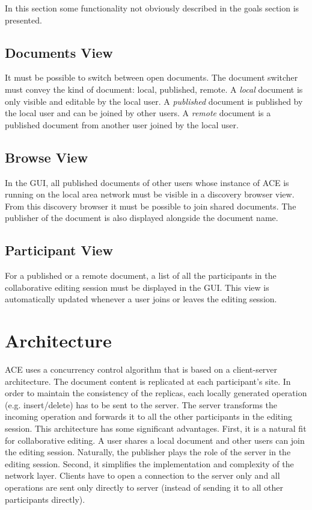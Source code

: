 \documentclass[11pt,a4paper]{article}
\begin{document}
In this section some functionality not obviously described in the goals section
is presented.

\subsection{Documents View}
It must be possible to switch between open documents. The document switcher must
convey the kind of document: local, published, remote. A
\emph{local} document is only visible and editable by the local user. A
\emph{published} document is published by the local user and can be joined by
other users. A \emph{remote} document is a published document from another
user joined by the local user.

\subsection{Browse View}
In the GUI, all published documents of other users whose instance of ACE
is running on the local area network must be visible in a discovery browser
view. From this discovery browser it must be possible to join shared documents.
The publisher of the document is also displayed alongside the document name.

\subsection{Participant View}
For a published or a remote document, a list of all the participants in the
collaborative editing session must be displayed in the GUI. This view is
automatically updated whenever a user joins or leaves the editing session.


\newpage
\section{Architecture}

ACE uses a concurrency control algorithm that is based on a client-server 
architecture. The document content is replicated at each participant's
site. In order to maintain the consistency of the replicas, each locally
generated operation (e.g. insert/delete) has to be sent to the server. The
server transforms the incoming operation and forwards it to all the other
participants in the editing session. This architecture has some significant
advantages. First, it is a natural fit for collaborative editing. A user shares 
a local document and other users can join the editing session. Naturally, the
publisher plays the role of the server in the editing session. Second, it
simplifies the implementation and complexity of the network layer. Clients
have to open a connection to the server only and all operations are sent only
directly to server (instead of sending it to all other participants directly).
\end{document}
